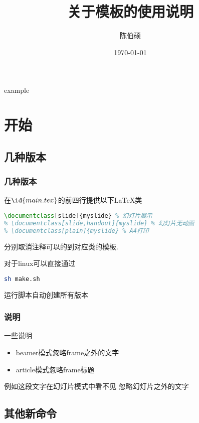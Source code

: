 \documentclass[slide]{myslide} %
\title{关于模板的使用说明}
\date{\today}
\author{陈伯硕}
\institute{github}
\begin{document}
\maketitle

\begin{frame}{example}
	\tableofcontents
\end{frame}

\section{开始}

\subsection{几种版本}



\begin{frame}[fragile]
  \frametitle{几种版本}
		在$\id{main.tex}$的前四行提供以下\LaTeX 类

\begin{lstlisting}[language=tex]
% \documentclass[ebook]{myslide} % 移动设备
\documentclass[slide]{myslide} % 幻灯片展示
% \documentclass[slide,handout]{myslide} % 幻灯片无动画
% \documentclass[plain]{myslide} % A4打印
\end{lstlisting}
	分别取消注释可以的到对应类的模板.

	对于linux可以直接通过
\begin{lstlisting}[language=bash]
sh make.sh
\end{lstlisting}
	运行脚本自动创建所有版本

\end{frame}

\subsubsection{说明}

	\begin{frame}{一些说明}
		\begin{itemize}
			\item beamer模式忽略frame之外的文字
			\item article模式忽略frame标题
		\end{itemize}

	\end{frame}
	例如这段文字在幻灯片模式中看不见
	忽略幻灯片之外的文字

\subsection{其他新命令}
\end{document}
